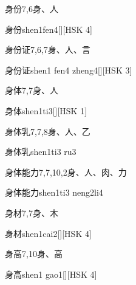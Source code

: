 \begin{Entry}{身份}{7,6}{⾝、⼈}
  \begin{Phonetics}{身份}{shen1fen4}[][HSK 4]
  \end{Phonetics}
\end{Entry}

\begin{Entry}{身份证}{7,6,7}{⾝、⼈、⾔}
  \begin{Phonetics}{身份证}{shen1 fen4 zheng4}[][HSK 3]
  \end{Phonetics}
\end{Entry}

\begin{Entry}{身体}{7,7}{⾝、⼈}
  \begin{Phonetics}{身体}{shen1ti3}[][HSK 1]
  \end{Phonetics}
\end{Entry}

\begin{Entry}{身体乳}{7,7,8}{⾝、⼈、⼄}
  \begin{Phonetics}{身体乳}{shen1ti3 ru3}
  \end{Phonetics}
\end{Entry}

\begin{Entry}{身体能力}{7,7,10,2}{⾝、⼈、⾁、⼒}
  \begin{Phonetics}{身体能力}{shen1ti3 neng2li4}
  \end{Phonetics}
\end{Entry}

\begin{Entry}{身材}{7,7}{⾝、⽊}
  \begin{Phonetics}{身材}{shen1cai2}[][HSK 4]
  \end{Phonetics}
\end{Entry}

\begin{Entry}{身高}{7,10}{⾝、⾼}
  \begin{Phonetics}{身高}{shen1 gao1}[][HSK 4]
  \end{Phonetics}
\end{Entry}

